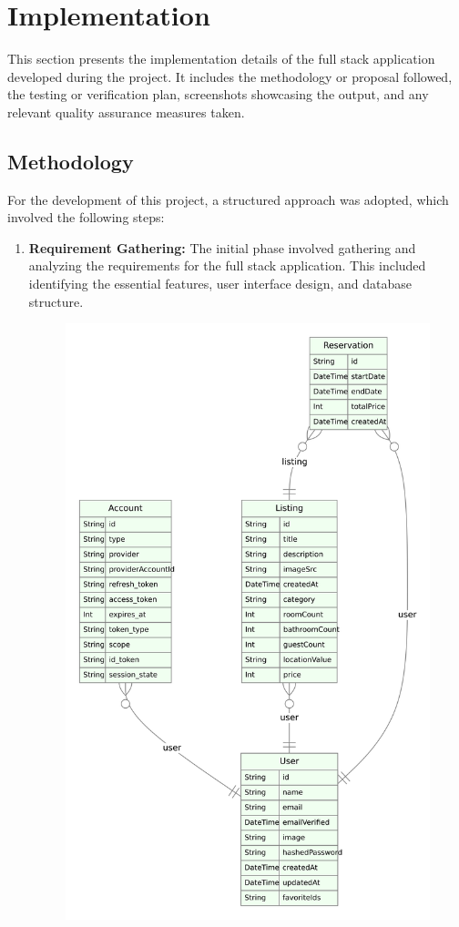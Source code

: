 \chapter{Implementation}
This section presents the implementation details of the full stack application developed during the project. It includes the methodology or proposal followed, the testing or verification plan, screenshots showcasing the output, and any relevant quality assurance measures taken.

\section{Methodology}
For the development of this project, a structured approach was adopted, which involved the following steps:

\begin{enumerate}
	\item \textbf{Requirement Gathering:} The initial phase involved gathering and analyzing the requirements for the full stack application. This included identifying the essential features, user interface design, and database structure.
	\begin{figure}[!h]
		\centering
		\includegraphics[scale=0.5]{chapters/images/erdiagram.png}

\end{figure}
\end{enumerate}
